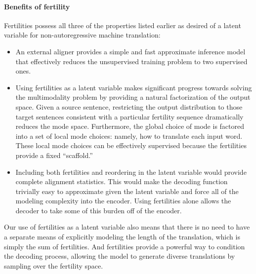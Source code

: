 \paragraph{Benefits of fertility} 
Fertilities possess all three of the properties listed earlier as desired of a latent variable for non-autoregressive machine translation:
\begin{itemize}
\item An external aligner provides a simple and fast approximate inference model that effectively reduces the unsupervised training problem to two supervised ones.
\item Using fertilities as a latent variable makes significant progress towards solving the multimodality problem by providing a natural factorization of the output space.
Given a source sentence, restricting the output distribution to those target sentences consistent with a particular fertility sequence dramatically reduces the mode space. Furthermore, the global choice of mode is factored into a set of local mode choices: namely, how to translate each input word. These local mode choices can be effectively supervised because the fertilities provide a fixed ``scaffold.''
\item Including both fertilities and reordering in the latent variable would provide complete alignment statistics. This would make the decoding function trivially easy to approximate given the latent variable and force all of the modeling complexity into the encoder. Using fertilities alone allows the decoder to take some of this burden off of the encoder.
\end{itemize}
Our use of fertilities as a latent variable also means that there is no need to have a separate means of explicitly modeling the length of the translation, which is simply the sum of fertilities.
And fertilities provide a powerful way to condition the decoding process, allowing the model to generate diverse translations by sampling over the fertility space.

